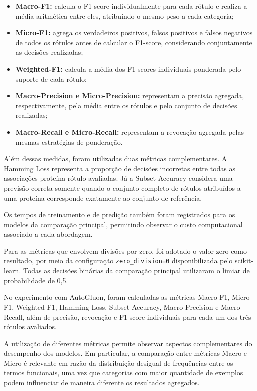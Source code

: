 \begin{itemize}
    \item \textbf{Macro-F1:} calcula o F1-score individualmente para cada rótulo e realiza a média aritmética entre eles, atribuindo o mesmo peso a cada categoria;
    \item \textbf{Micro-F1:} agrega os verdadeiros positivos, falsos positivos e falsos negativos de todos os rótulos antes de calcular o F1-score, considerando conjuntamente as decisões realizadas;
    \item \textbf{Weighted-F1:} calcula a média dos F1-scores individuais ponderada pelo suporte de cada rótulo;
    \item \textbf{Macro-Precision e Micro-Precision:} representam a precisão agregada, respectivamente, pela média entre os rótulos e pelo conjunto de decisões realizadas;
    \item \textbf{Macro-Recall e Micro-Recall:} representam a revocação agregada pelas mesmas estratégias de ponderação.
\end{itemize}

Além dessas medidas, foram utilizadas duas métricas complementares. A Hamming Loss representa a proporção de decisões incorretas entre todas as associações proteína-rótulo avaliadas. Já a Subset Accuracy considera uma previsão correta somente quando o conjunto completo de rótulos atribuídos a uma proteína corresponde exatamente ao conjunto de referência.

Os tempos de treinamento e de predição também foram registrados para os modelos da comparação principal, permitindo observar o custo computacional associado a cada abordagem.

Para as métricas que envolvem divisões por zero, foi adotado o valor zero como resultado, por meio da configuração \texttt{zero\_division=0} disponibilizada pelo scikit-learn. Todas as decisões binárias da comparação principal utilizaram o limiar de probabilidade de 0,5.

No experimento com AutoGluon, foram calculadas as métricas Macro-F1, Micro-F1, Weighted-F1, Hamming Loss, Subset Accuracy, Macro-Precision e Macro-Recall, além de precisão, revocação e F1-score individuais para cada um dos três rótulos avaliados.

A utilização de diferentes métricas permite observar aspectos complementares do desempenho dos modelos. Em particular, a comparação entre métricas Macro e Micro é relevante em razão da distribuição desigual de frequências entre os termos funcionais, uma vez que categorias com maior quantidade de exemplos podem influenciar de maneira diferente os resultados agregados.



